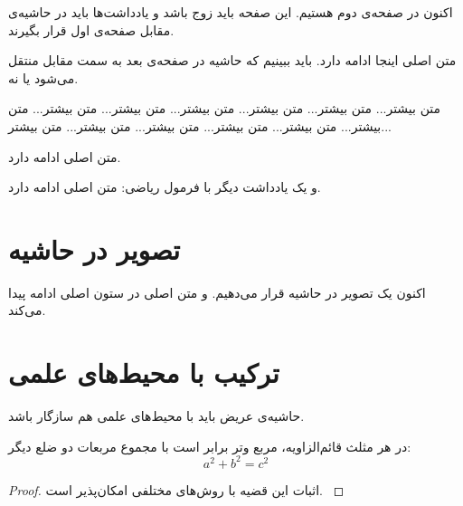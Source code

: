 \documentclass{matinbook}
\begin{document}
اکنون در صفحه‌ی دوم هستیم. این صفحه باید زوج باشد و
یادداشت‌ها باید در حاشیه‌ی مقابل صفحه‌ی اول قرار بگیرند.

متن اصلی اینجا ادامه دارد. باید ببینیم که حاشیه در صفحه‌ی
بعد به سمت مقابل منتقل می‌شود یا نه.

متن بیشتر... متن بیشتر... متن بیشتر... متن بیشتر...
متن بیشتر... متن بیشتر... متن بیشتر... متن بیشتر...
متن بیشتر... متن بیشتر... متن بیشتر... متن بیشتر...

متن اصلی ادامه دارد.

و یک یادداشت دیگر با فرمول ریاضی:
متن اصلی ادامه دارد.

\section{تصویر در حاشیه}
\label{sec:marginfig}

اکنون یک تصویر در حاشیه قرار می‌دهیم.
و متن اصلی در ستون اصلی ادامه پیدا می‌کند.

\section{ترکیب با محیط‌های علمی}
\label{sec:with-theorems}

حاشیه‌ی عریض باید با محیط‌های علمی هم سازگار باشد.

\begin{theorem}
    در هر مثلث قائم‌الزاویه، مربع وتر برابر است با مجموع
    مربعات دو ضلع دیگر:
    \[
    a^2 + b^2 = c^2
    \]
    \label{thm:pythagoras}
\end{theorem}


\begin{proof}
    اثبات این قضیه با روش‌های مختلفی امکان‌پذیر است.
    \label{prf:pythagoras}
\end{proof}

\end{document}
